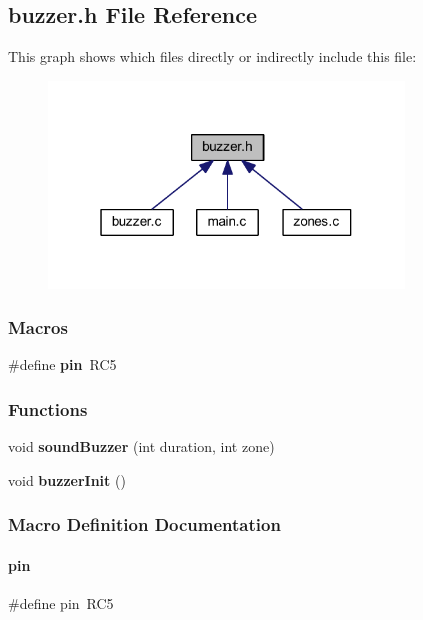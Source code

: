 \subsection{buzzer.\+h File Reference}
\label{a00011}
This graph shows which files directly or indirectly include this file\+:
\nopagebreak
\begin{figure}[H]
\begin{center}
\leavevmode
\includegraphics[width=268pt]{a00013}
\end{center}
\end{figure}
\subsubsection*{Macros}
\begin{DoxyCompactItemize}
\item 
\#define \textbf{ pin}~R\+C5
\end{DoxyCompactItemize}
\subsubsection*{Functions}
\begin{DoxyCompactItemize}
\item 
void \textbf{ sound\+Buzzer} (int duration, int zone)
\item 
void \textbf{ buzzer\+Init} ()
\end{DoxyCompactItemize}


\subsubsection{Macro Definition Documentation}
\mbox{\label{a00011_ab8451cb6d236c9f6399f800d36163767}} 
\paragraph{pin}
{\footnotesize\ttfamily \#define pin~R\+C5}



